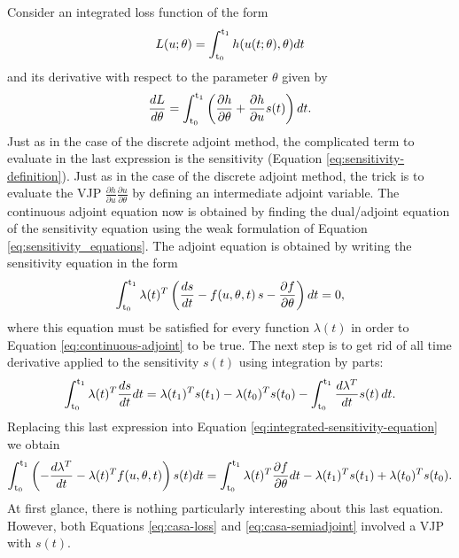 Consider an integrated loss function of the form 
\begin{equation}
    L(u; \theta) = \operatorname{\int_{t_0}^{t_1}} h(u(t;\theta), \theta) dt
\end{equation}
and its derivative with respect to the parameter $\theta$ given by
\begin{equation}
    \frac{dL}{d\theta}
    = 
    \operatorname{\int_{t_0}^{t_1}} \left( \frac{\partial h}{\partial \theta} + \frac{\partial h}{\partial u} s(t) \right) dt.
    \label{eq:casa-loss}
\end{equation}
Just as in the case of the discrete adjoint method, the complicated term to evaluate in the last expression is the sensitivity (Equation \eqref{eq:sensitivity-definition}).
Just as in the case of the discrete adjoint method, the trick is to evaluate the VJP $\frac{\partial h}{\partial u} \frac{\partial u}{\partial \theta}$ by defining an intermediate adjoint variable. 
The continuous adjoint equation now is obtained by finding the dual/adjoint equation of the sensitivity equation using the weak formulation of Equation \eqref{eq:sensitivity_equations}. 
The adjoint equation is obtained by writing the sensitivity equation in the form 
\begin{equation}
    \operatorname{\int_{t_0}^{t_1}} \lambda(t)^T \left( \frac{ds}{dt} - f(u, \theta, t) \, s - \frac{\partial f}{\partial \theta}  \right) dt 
    = 
    0,
    \label{eq:integrated-sensitivity-equation}
\end{equation}
where this equation must be satisfied for every function $\lambda(t)$ in order to Equation \eqref{eq:continuous-adjoint} to be true. 
The next step is to get rid of all time derivative applied to the sensitivity $s(t)$ using integration by parts: 
\begin{equation}
    \operatorname{\int_{t_0}^{t_1}} \lambda(t)^T \frac{ds}{dt} dt
    = 
    \lambda(t_1)^T s(t_1) - \lambda(t_0)^T s(t_0)
    -
    \operatorname{\int_{t_0}^{t_1}} \frac{d\lambda^T}{dt} s(t)\, dt.
\end{equation}
Replacing this last expression into Equation \eqref{eq:integrated-sensitivity-equation} we obtain 
\begin{equation}
    \operatorname{\int_{t_0}^{t_1}} \left( - \frac{d\lambda^T}{dt} -  \lambda(t)^T f(u, \theta, t) \right) s(t) dt
    =
    \operatorname{\int_{t_0}^{t_1}} \lambda(t)^T \frac{\partial f}{\partial \theta} dt 
    - 
    \lambda(t_1)^T s(t_1)
    + 
    \lambda(t_0)^T s(t_0).
    \label{eq:casa-semiadjoint}
\end{equation}
At first glance, there is nothing particularly interesting about this last equation. 
However, both Equations \eqref{eq:casa-loss} and \eqref{eq:casa-semiadjoint} involved a VJP with $s(t)$. 
